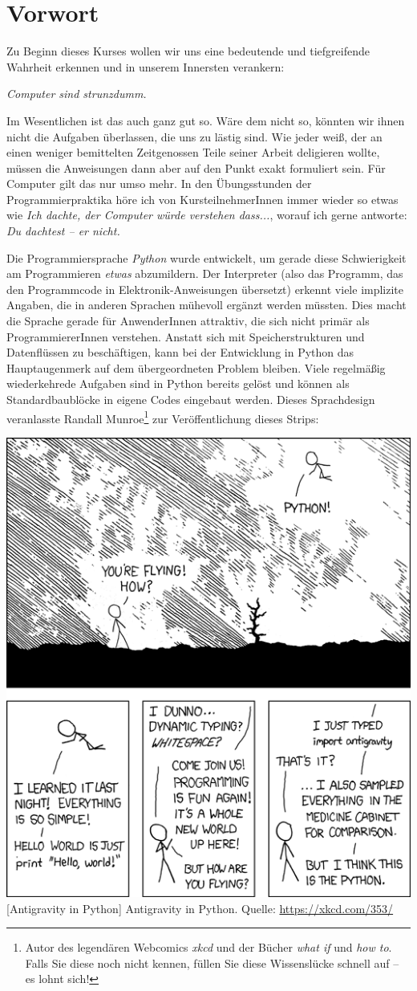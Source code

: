 \chapter*{Vorwort}
Zu Beginn dieses Kurses wollen wir uns eine bedeutende und tiefgreifende Wahrheit erkennen und in unserem Innersten verankern:

\begin{center}
\begin{Huge}
	\emph{Computer sind strunzdumm.}
\end{Huge}
\end{center}

Im Wesentlichen ist das auch ganz gut so. Wäre dem nicht so, könnten wir ihnen nicht die Aufgaben überlassen, die uns zu lästig sind. Wie jeder weiß, der an einen weniger bemittelten Zeitgenossen Teile seiner Arbeit deligieren wollte, müssen die Anweisungen dann aber auf den Punkt exakt formuliert sein. Für Computer gilt das nur umso mehr. In den Übungsstunden der Programmierpraktika höre ich von KursteilnehmerInnen immer wieder so etwas wie \emph{Ich dachte, der Computer würde verstehen dass...}, worauf ich gerne antworte: \emph{Du dachtest -- er nicht.}

Die Programmiersprache \emph{Python} wurde entwickelt, um gerade diese Schwierigkeit am Programmieren \emph{etwas} abzumildern. Der Interpreter (also das Programm, das den Programmcode in Elektronik-Anweisungen übersetzt) erkennt viele implizite Angaben, die in anderen Sprachen mühevoll ergänzt werden müssten. Dies macht die Sprache gerade für AnwenderInnen attraktiv, die sich nicht primär als Programmierer\-Innen verstehen. Anstatt sich mit Speicherstrukturen und Datenflüssen zu beschäftigen, kann bei der Entwicklung in Python das Hauptaugenmerk auf dem übergeordneten Problem bleiben. Viele regelmäßig wiederkehrede Aufgaben sind in Python bereits gelöst und können als Standardbaublöcke in eigene Codes eingebaut werden. Dieses Sprachdesign veranlasste Randall Munroe\footnote{Autor des legendären Webcomics \emph{xkcd} und der Bücher \emph{what if} und \emph{how to}. Falls Sie diese noch nicht kennen, füllen Sie diese Wissenslücke schnell auf -- es lohnt sich!} zur Veröffentlichung dieses Strips:

\begin{center}
\includegraphics[width=.4\linewidth]{./gfx/xkcd-python}
	[Antigravity in Python]
	{Antigravity in Python. Quelle: \url{https://xkcd.com/353/}}
\end{center}


